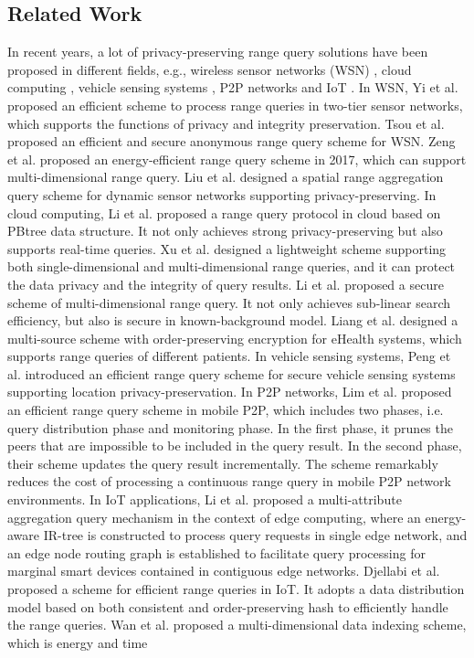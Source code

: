 \documentclass[IEEE JOURNAL OF BIOMEDICAL AND HEALTH INFORMATICS]{IEEEtran}
\begin{document}
\subsection{Related Work}
  In recent years, a lot of privacy-preserving range query solutions have been proposed in different fields, e.g., wireless sensor networks (WSN) \cite{yi2013a,2017SER,zeng2017tieredWSN,2019Energy}, cloud computing \cite{li2016cloudcomputing,2019A, 2019Efficient, 2020Privacy}, vehicle sensing systems \cite{0Efficient}, P2P networks \cite{2020An} and IoT \cite{Li2019,2019Effective,1111,mahdikhani2020IoT,hasan2020IoT,mahdikhani2020using}. In WSN, Yi et al. \cite{yi2013a} proposed an efficient scheme to process range queries in two-tier sensor networks, which supports the functions of privacy and integrity preservation. Tsou et al. \cite{2017SER} proposed an efficient and secure anonymous range query scheme for WSN. Zeng et al. \cite{zeng2017tieredWSN} proposed an energy-efficient range query scheme in 2017, which can support multi-dimensional range query. Liu et al. \cite{2019Energy} designed a spatial range aggregation query scheme for dynamic sensor networks supporting privacy-preserving. In cloud computing, Li et al. \cite{li2016cloudcomputing} proposed a range query protocol in cloud based on PBtree data structure. It not only achieves strong privacy-preserving but also supports real-time queries. Xu et al. \cite{2019A} designed a lightweight scheme supporting both single-dimensional and multi-dimensional range queries, and it can protect the data privacy and the integrity of query results. Li et al. \cite{2019Efficient} proposed a secure scheme of multi-dimensional range query. It not only achieves sub-linear search efficiency, but also is secure in known-background model. Liang et al. \cite{2020Privacy} designed a multi-source scheme with order-preserving encryption for eHealth systems, which supports range queries of different patients. In vehicle sensing systems, Peng et al. \cite{0Efficient} introduced an efficient range query scheme for secure vehicle sensing systems supporting location privacy-preservation. In P2P networks, Lim et al. \cite{2020An} proposed an efficient range query scheme in mobile P2P, which includes two phases, i.e. query distribution phase and monitoring phase. In the first phase, it prunes the peers that are impossible to be included in the query result. In the second phase, their scheme updates the query result incrementally. The scheme remarkably reduces the cost of processing a continuous range query in mobile P2P network environments. In IoT applications, Li et al. \cite{Li2019} proposed a multi-attribute aggregation query mechanism in the context of edge computing, where an energy-aware IR-tree is constructed to process query requests in single edge network, and an edge node routing graph is established to facilitate query processing for marginal smart devices contained in contiguous edge networks. Djellabi et al. \cite{2019Effective} proposed a scheme for efficient range queries in IoT. It adopts a data distribution model based on both consistent and order-preserving hash to efficiently handle the range queries. Wan et al. \cite{1111} proposed a multi-dimensional data indexing scheme, which is energy and time 
\end{document}
